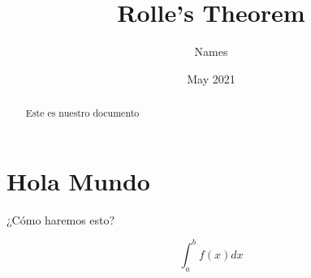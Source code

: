 \documentclass{article}
\title{Rolle's Theorem}
\author{Names}
\date{May 2021}
\begin{document}
    \maketitle

    \begin{abstract}
        Este es nuestro documento
    \end{abstract}

    \section*{Hola Mundo}
    ¿Cómo haremos esto? 

    $$ 
    \int_a^bf(x)dx
    $$
\end{document}
